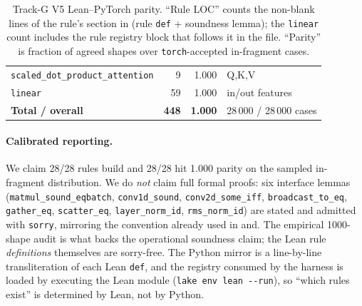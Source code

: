 \begin{table}[h]
\begin{tabular}{lrrl}
\texttt{scaled\_dot\_product\_attention} & 9 & 1.000 & Q,K,V \\
\texttt{linear} & 59 & 1.000 & in/out features \\
\midrule
\textbf{Total / overall} & \textbf{448} & \textbf{1.000} & 28\,000 / 28\,000 cases \\
\bottomrule
\end{tabular}
\caption{Track-G V5 Lean--PyTorch parity. ``Rule LOC'' counts the
non-blank lines of the rule's section in
 (rule \texttt{def} + soundness lemma);
the \texttt{linear} count includes the rule registry block that
follows it in the file. ``Parity'' is fraction of agreed shapes over
\texttt{torch}-accepted in-fragment cases.}
\label{tab:lean-parity-v5}
\end{table}

\paragraph{Calibrated reporting.}
We claim 28/28 rules build and 28/28 hit 1.000 parity on the
sampled in-fragment distribution. We do \emph{not} claim full
formal proofs: six interface lemmas (\texttt{matmul\_sound\_eqbatch},
\texttt{conv1d\_sound}, \texttt{conv2d\_some\_iff},
\texttt{broadcast\_to\_eq}, \texttt{gather\_eq}, \texttt{scatter\_eq},
\texttt{layer\_norm\_id}, \texttt{rms\_norm\_id}) are stated and
admitted with \texttt{sorry}, mirroring the convention already used
in and. The
empirical 1000-shape audit is what backs the operational soundness
claim; the Lean rule \emph{definitions} themselves are sorry-free.
The Python mirror is a line-by-line transliteration of each Lean
\texttt{def}, and the registry consumed by the harness is loaded by
executing the Lean module (\texttt{lake env lean -{}-run}), so
``which rules exist'' is determined by Lean, not by Python.
